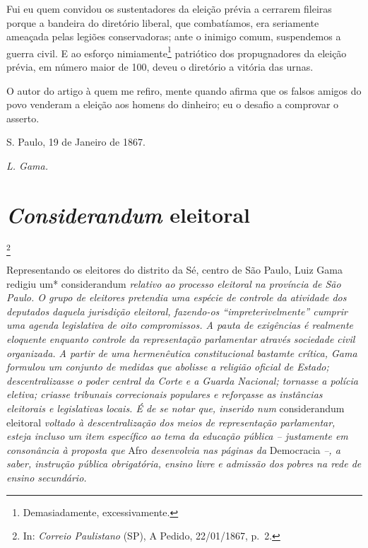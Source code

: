 Fui eu quem convidou os sustentadores da eleição prévia a cerrarem
fileiras porque a bandeira do diretório liberal, que combatíamos, era
seriamente ameaçada pelas legiões conservadoras; ante o inimigo comum,
suspendemos a guerra civil. E ao esforço nimiamente\footnote{Demasiadamente,
  excessivamente.} patriótico dos propugnadores da eleição prévia, em
número maior de 100, deveu o diretório a vitória das urnas.

O autor do artigo à quem me refiro, mente quando afirma que os falsos
amigos do povo venderam a eleição aos homens do dinheiro; eu o desafio a
comprovar o asserto.

S. Paulo, 19 de Janeiro de 1867.

\emph{L. Gama.}

\chapter{\emph{Considerandum} eleitoral}\footnote{In: \emph{Correio
  Paulistano} (SP), A Pedido, 22/01/1867, p.~2.}

\begin{didascalia}
Representando os eleitores do distrito da Sé, centro de São Paulo, Luiz
Gama redigiu um* considerandum \emph{relativo ao processo eleitoral na
província de São Paulo. O grupo de eleitores pretendia uma espécie de
controle da atividade dos deputados daquela jurisdição eleitoral,
fazendo-os ``impreterivelmente'' cumprir uma agenda legislativa de oito
compromissos. A pauta de exigências é realmente eloquente enquanto
controle da representação parlamentar através sociedade civil
organizada. A partir de uma hermenêutica constitucional bastamte
crítica, Gama formulou um conjunto de medidas que abolisse a religião
oficial de Estado; descentralizasse o poder central da Corte e a Guarda
Nacional; tornasse a polícia eletiva; criasse tribunais correcionais
populares e reforçasse as instâncias eleitorais e legislativas locais. É
de se notar que, inserido num} considerandum eleitoral \emph{voltado à
descentralização dos meios de representação parlamentar, esteja incluso
um item específico ao tema da educação pública -- justamente em
consonância à proposta que} Afro \emph{desenvolvia nas páginas da}
Democracia \emph{--, a saber, instrução pública obrigatória, ensino
livre e admissão dos pobres na rede de ensino secundário.}
\end{didascalia}

\asterisc{}

